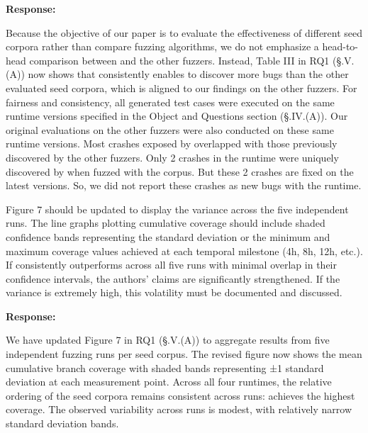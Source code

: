 \documentclass[11pt]{article}
\newenvironment{response}{%
    \par\vspace{10pt}
    \par\noindent\textbf{\color{tseblue}Response:}\par\nobreak\ignorespaces
}{%
    \par\vspace{15pt}
}
\newcounter{reviewernum}
\newcounter{cmtcounter}[reviewernum]
\newenvironment{rcomment}{%
    \stepcounter{cmtcounter}%
    \begin{revcomment}[R\thereviewernum{}.C\thecmtcounter{}.~Reviewer~\thereviewernum{}, Comment~\thecmtcounter]
}{%
    \end{revcomment}
}
\begin{document}
\begin{response}
    Because the objective of our paper is to evaluate the effectiveness of different seed corpora rather than compare fuzzing algorithms, we do not emphasize a head-to-head comparison between \lwdiff{} and the other fuzzers. Instead, Table III in RQ1 (§.V.(A)) now shows that \rtbench{} consistently enables \lwdiff{} to discover more bugs than the other evaluated seed corpora, which is aligned to our findings on the other fuzzers. For fairness and consistency, all generated test cases were executed on the same runtime versions specified in the Object and Questions section (§.IV.(A)). Our original evaluations on the other fuzzers were also conducted on these same runtime versions. Most crashes exposed by \lwdiff{} overlapped with those previously discovered by the other fuzzers. Only 2 crashes in the \wamr{} runtime were uniquely discovered by \lwdiff{} when fuzzed with the \rtbench{} corpus. But these 2 crashes are fixed on the latest versions. So, we did not report these crashes as new bugs with the \wamr{} runtime.

\end{response}

\begin{rcomment}
    Figure 7 should be updated to display the variance across the five independent runs. The line graphs plotting cumulative coverage should include shaded confidence bands representing the standard deviation or the minimum and maximum coverage values achieved at each temporal milestone (4h, 8h, 12h, etc.). If \rtbench{} consistently outperforms \llvmbench{} across all five runs with minimal overlap in their confidence intervals, the authors' claims are significantly strengthened. If the variance is extremely high, this volatility must be documented and discussed.
\end{rcomment}
\begin{response}
    We have updated Figure 7 in RQ1 (§.V.(A)) to aggregate results from five independent fuzzing runs per seed corpus. The revised figure now shows the mean cumulative branch coverage with shaded bands representing ±1 standard deviation at each measurement point. Across all four runtimes, the relative ordering of the seed corpora remains consistent across runs: \rtbench{} achieves the highest coverage. The observed variability across runs is modest, with relatively narrow standard deviation bands.
\end{response}



\end{document}
